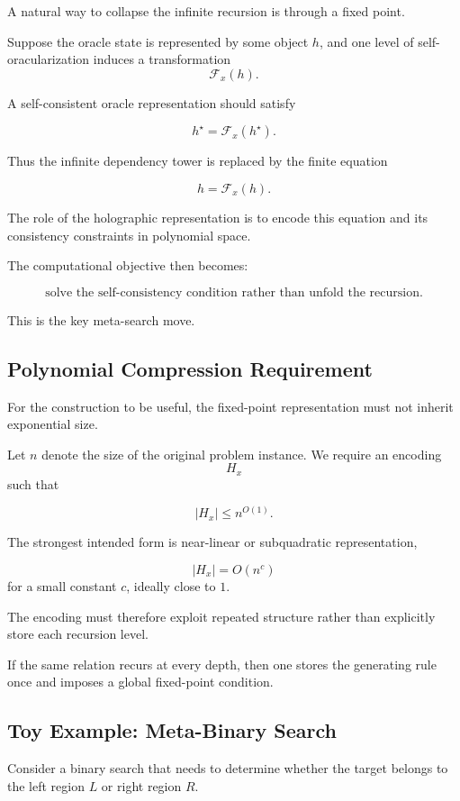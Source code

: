 \documentclass[11pt]{article}
\theoremstyle{plain}
\theoremstyle{definition}
\begin{document}
A natural way to collapse the infinite recursion is through a fixed point.

Suppose the oracle state is represented by some object \(h\), and one level
of self-oracularization induces a transformation
\[
    \mathcal{F}_x(h).
\]

A self-consistent oracle representation should satisfy

\[
    h^\star
    =
    \mathcal{F}_x(h^\star).
\]

Thus the infinite dependency tower is replaced by the finite equation

\[
\boxed{
h=\mathcal{F}_x(h).
}
\]

The role of the holographic representation is to encode this equation and its
consistency constraints in polynomial space.

The computational objective then becomes:

\[
\boxed{
\text{solve the self-consistency condition rather than unfold the recursion}.
}
\]

This is the key meta-search move.

\subsection{Polynomial Compression Requirement}

For the construction to be useful, the fixed-point representation must not
inherit exponential size.

Let \(n\) denote the size of the original problem instance.  We require an
encoding
\[
    H_x
\]
such that

\[
    |H_x|\leq n^{O(1)}.
\]

The strongest intended form is near-linear or subquadratic representation,

\[
    |H_x|=O(n^c)
\]
for a small constant \(c\), ideally close to \(1\).

The encoding must therefore exploit repeated structure rather than explicitly
store each recursion level.

If the same relation recurs at every depth, then one stores the generating
rule once and imposes a global fixed-point condition.

\subsection{Toy Example: Meta-Binary Search}

Consider a binary search that needs to determine whether the target belongs to
the left region \(L\) or right region \(R\).
\end{document}
